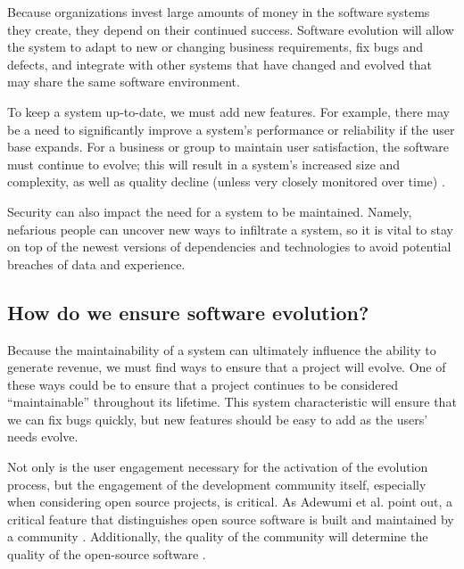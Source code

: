 Because organizations invest large amounts of money in the software systems they create, they depend on their continued success. Software evolution will allow the system to adapt to new or changing business requirements, fix bugs and defects, and integrate with other systems that have changed and evolved that may share the same software environment.

To keep a system up-to-date, we must add new features. For example, there may be a need to significantly improve a system's performance or reliability if the user base expands. For a business or group to maintain user satisfaction, the software must continue to evolve; this will result in a system's increased size and complexity, as well as quality decline (unless very closely monitored over time) \cite{yu:2013}.

Security can also impact the need for a system to be maintained. Namely, nefarious people can uncover new ways to infiltrate a system, so it is vital to stay on top of the newest versions of dependencies and technologies to avoid potential breaches of data and experience.

\subsection{How do we ensure software evolution?} \label{subEnsureEvolution}

Because the maintainability of a system can ultimately influence the ability to generate revenue, we must find ways to ensure that a project will evolve. One of these ways could be to ensure that a project continues to be considered ``maintainable'' throughout its lifetime. This system characteristic will ensure that we can fix bugs quickly, but new features should be easy to add as the users' needs evolve.

Not only is the user engagement necessary for the activation of the evolution process, but the engagement of the development community itself, especially when considering open source projects, is critical. As Adewumi et al. point out, a critical feature that distinguishes open source software is built and maintained by a community \cite{haaland:2010}. Additionally, the quality of the community will determine the quality of the open-source software \cite{samoladas:2008}.
